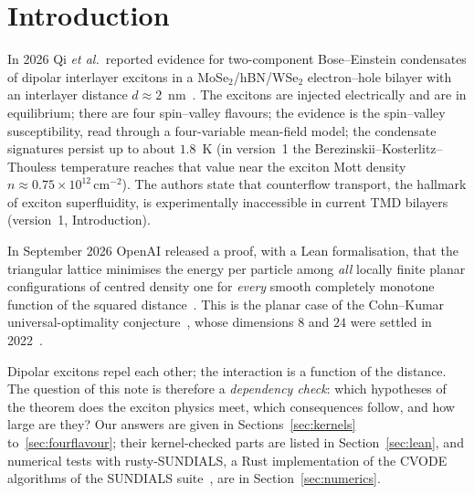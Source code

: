 \documentclass[11pt,a4paper]{article}
\begin{document}
\section{Introduction}

In 2026 Qi \emph{et al.}\ reported evidence for two-component Bose--Einstein condensates of dipolar interlayer excitons in a
MoSe$_2$/hBN/WSe$_2$ electron--hole bilayer with an interlayer distance $d\approx 2$~nm~\cite{Qi2026}. The excitons are injected
electrically and are in equilibrium; there are four spin--valley flavours; the evidence is the spin--valley susceptibility, read through a
four-variable mean-field model; the condensate signatures persist up to about $1.8$~K (in version~1 the
Berezinskii--Kosterlitz--Thouless temperature reaches that value near the exciton Mott density
$n\approx 0.75\times10^{12}\,\mathrm{cm}^{-2}$). The authors state that counterflow transport, the hallmark of exciton superfluidity, is
experimentally inaccessible in current TMD bilayers (version~1, Introduction).

In September 2026 OpenAI released a proof, with a Lean formalisation, that the triangular lattice minimises the energy per particle among
\emph{all} locally finite planar configurations of centred density one for \emph{every} smooth completely monotone function of the squared
distance~\cite{OpenAI2026}. This is the planar case of the Cohn--Kumar universal-optimality conjecture~\cite{CohnKumar2007}, whose
dimensions $8$ and $24$ were settled in 2022~\cite{CKMRV2022}.

Dipolar excitons repel each other; the interaction is a function of the distance. The question of this note is therefore a
\emph{dependency check}: which hypotheses of the theorem does the exciton physics meet, which consequences follow, and how large are
they? Our answers are given in Sections~\ref{sec:kernels} to~\ref{sec:fourflavour}; their kernel-checked parts are listed in
Section~\ref{sec:lean}, and numerical tests with rusty-SUNDIALS, a Rust implementation of the CVODE algorithms of the
SUNDIALS suite~\cite{Hindmarsh2005}, are in Section~\ref{sec:numerics}.
\end{document}
